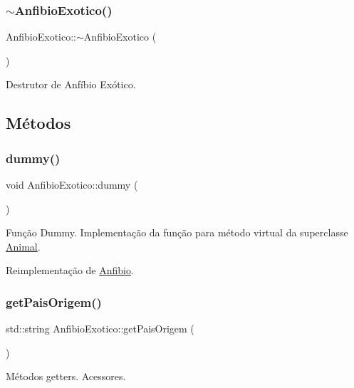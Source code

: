 \subsubsection{\texorpdfstring{$\sim$\+Anfibio\+Exotico()}{~AnfibioExotico()}}
{\footnotesize\ttfamily Anfibio\+Exotico\+::$\sim$\+Anfibio\+Exotico (\begin{DoxyParamCaption}{ }\end{DoxyParamCaption})}

Destrutor de Anfíbio Exótico. 

\subsection{Métodos}
\mbox{\label{classAnfibioExotico_a192645b6588bc584145f70be14862d77}} 
\subsubsection{\texorpdfstring{dummy()}{dummy()}}
{\footnotesize\ttfamily void Anfibio\+Exotico\+::dummy (\begin{DoxyParamCaption}{ }\end{DoxyParamCaption})\hspace{0.3cm}{\ttfamily [virtual]}}

Função Dummy. Implementação da função para método virtual da superclasse \hyperlink{classAnimal}{Animal}. 

Reimplementação de \hyperlink{classAnfibio_a5f92eac4e6add9b2798119cc38dda093}{Anfibio}.

\mbox{\label{classAnfibioExotico_a864e2e4005b93d7a74bb28596538d847}} 
\subsubsection{\texorpdfstring{get\+Pais\+Origem()}{getPaisOrigem()}}
{\footnotesize\ttfamily std\+::string Anfibio\+Exotico\+::get\+Pais\+Origem (\begin{DoxyParamCaption}{ }\end{DoxyParamCaption})}

Métodos getters. Acessores. \mbox{\label{classAnfibioExotico_a239fa1e80542aa344cf7c59b6d339f09}} 
